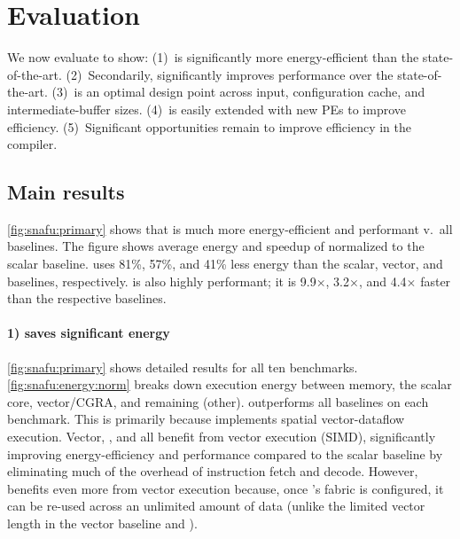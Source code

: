 \section{Evaluation}
\label{snafu:eval}

\figSNAFUPrimaryResults

We now evaluate \snafuarch to show:
(1)~\snafuarch is significantly more energy-efficient than the state-of-the-art.
(2)~Secondarily, \snafuarch significantly improves performance over the state-of-the-art.
(3)~\snafuarch is an optimal design point across input, configuration cache, and intermediate-buffer sizes.
(4)~\snafuframe is easily extended with new PEs to improve efficiency.
(5)~Significant opportunities remain to improve efficiency in the compiler.

\figSNAFUSensInputResults

\subsection{Main results}
\autoref{fig:snafu:primary} shows that \snafuarch is much more energy-efficient and performant v.\ all baselines.
% 
The figure shows average energy and speedup of \snafuarch normalized to the scalar baseline.
% 
\snafuarch uses 81\%, 57\%, and 41\% less energy than the scalar, vector, and \manic baselines, respectively.
% 
\snafuarch is also highly performant; it is 9.9$\times$, 3.2$\times$, and 4.4$\times$ faster than the respective baselines.
% 

\paragraph{1) \snafuarch saves significant energy}
\autoref{fig:snafu:primary} shows detailed results for all ten benchmarks.
% 
\autoref{fig:snafu:energy:norm} breaks down execution energy between memory, the scalar core, vector/CGRA, and remaining (other).
% 
\snafuarch outperforms all baselines on each benchmark.
% 
This is primarily because \snafuarch implements spatial vector-dataflow execution.
%
Vector, \manic, and \snafuarch all benefit from vector execution (SIMD), significantly improving energy-efficiency and performance compared to the scalar baseline by eliminating much of the overhead of instruction fetch and decode.
%
However, \snafuarch benefits even more from vector execution
because, once \snafuarch's fabric is configured, it can be re-used across an unlimited amount of data
(unlike the limited vector length in the vector baseline and \manic).


